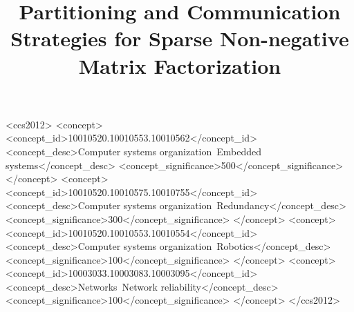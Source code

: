\documentclass[sigconf, review=true]{acmart}
\begin{document}
\title{Partitioning and Communication Strategies for Sparse Non-negative Matrix Factorization}

%
%
\begin{CCSXML}
<ccs2012>
 <concept>
  <concept_id>10010520.10010553.10010562</concept_id>
  <concept_desc>Computer systems organization~Embedded systems</concept_desc>
  <concept_significance>500</concept_significance>
 </concept>
 <concept>
  <concept_id>10010520.10010575.10010755</concept_id>
  <concept_desc>Computer systems organization~Redundancy</concept_desc>
  <concept_significance>300</concept_significance>
 </concept>
 <concept>
  <concept_id>10010520.10010553.10010554</concept_id>
  <concept_desc>Computer systems organization~Robotics</concept_desc>
  <concept_significance>100</concept_significance>
 </concept>
 <concept>
  <concept_id>10003033.10003083.10003095</concept_id>
  <concept_desc>Networks~Network reliability</concept_desc>
  <concept_significance>100</concept_significance>
 </concept>
</ccs2012>  
\end{CCSXML}




\maketitle



%







%

 

%
\end{document}
